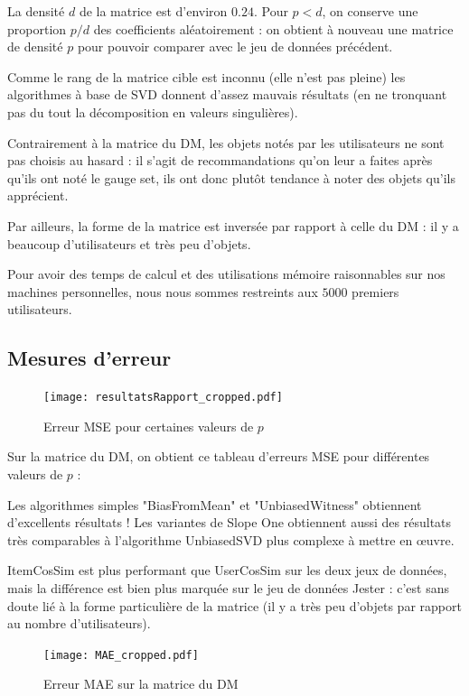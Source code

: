 \documentclass[11pt, openany, a4paper]{article}
\begin{document}
		La densité $d$ de la matrice est d'environ $0.24$. Pour $p<d$, on conserve une proportion $p/d$ des coefficients aléatoirement : on obtient à nouveau une matrice de densité $p$ pour pouvoir comparer avec le jeu de données précédent.
		
		Comme le rang de la matrice cible est inconnu (elle n'est pas pleine) les algorithmes à base de SVD donnent d'assez mauvais résultats (en ne tronquant pas du tout la décomposition en valeurs singulières).
		
		Contrairement à la matrice du DM, les objets notés par les utilisateurs ne sont pas choisis au hasard : il s'agit de recommandations qu'on leur a faites après qu'ils ont noté le gauge set, ils ont donc plutôt tendance à noter des objets qu'ils apprécient.
		
		Par ailleurs, la forme de la matrice est inversée par rapport à celle du DM : il y a beaucoup d'utilisateurs et très peu d'objets.
		
		Pour avoir des temps de calcul et des utilisations mémoire raisonnables sur nos machines personnelles, nous nous sommes restreints aux $5000$ premiers utilisateurs.
	
	\subsection{Mesures d'erreur}
	
		\begin{figure}[ht!]
			\centering
			\texttt{[image: resultatsRapport\_cropped.pdf]}
			\caption{Erreur MSE pour certaines valeurs de $p$}
		\end{figure}
		Sur la matrice du DM, on obtient ce tableau d'erreurs MSE pour différentes valeurs de $p$ :
		
		
		Les algorithmes simples "BiasFromMean" et "UnbiasedWitness" obtiennent d'excellents résultats ! Les variantes de Slope One obtiennent aussi des résultats très comparables à l'algorithme UnbiasedSVD plus complexe à mettre en œuvre.
		
		ItemCosSim est plus performant que UserCosSim sur les deux jeux de données, mais la différence est bien plus marquée sur le jeu de données Jester : c'est sans doute lié à la forme particulière de la matrice (il y a très peu d'objets par rapport au nombre d'utilisateurs).
		
		\begin{figure}[ht!]
			\centering
			\texttt{[image: MAE\_cropped.pdf]}
			\caption{Erreur MAE sur la matrice du DM}
		\end{figure}
		
\end{document}
